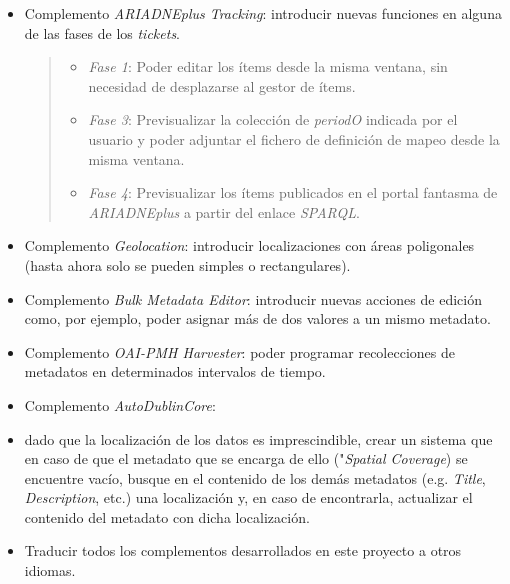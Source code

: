 \begin{itemize}
\item
  Complemento \emph{ARIADNEplus Tracking}: introducir nuevas funciones
  en alguna de las fases de los \emph{tickets}.

  \begin{quote}
  \begin{itemize}
  \tightlist
  \item
    \emph{Fase 1}: Poder editar los ítems desde la misma ventana, sin
    necesidad de desplazarse al gestor de ítems.
  \item
    \emph{Fase 3}: Previsualizar la colección de \emph{periodO} indicada
    por el usuario y poder adjuntar el fichero de definición de mapeo
    desde la misma ventana.
  \item
    \emph{Fase 4}: Previsualizar los ítems publicados en el portal
    fantasma de \emph{ARIADNEplus} a partir del enlace \emph{SPARQL}.
  \end{itemize}
  \end{quote}
\item
  Complemento \emph{Geolocation}: introducir localizaciones con áreas
  poligonales (hasta ahora solo se pueden simples o rectangulares).
\item
  Complemento \emph{Bulk Metadata Editor}: introducir nuevas acciones de
  edición como, por ejemplo, poder asignar más de dos valores a un mismo
  metadato.
\item
  Complemento \emph{OAI-PMH Harvester}: poder programar recolecciones de
  metadatos en determinados intervalos de tiempo.
\item
  Complemento \emph{AutoDublinCore}: \item
  dado que la localización de los datos es imprescindible, crear un
  sistema que en caso de que el metadato que se encarga de ello
  ("\emph{Spatial Coverage}) se encuentre vacío, busque en el contenido
  de los demás metadatos (e.g. \emph{Title}, \emph{Description}, etc.)
  una localización y, en caso de encontrarla, actualizar el contenido
  del metadato con dicha localización.
\item 
  Traducir todos los complementos desarrollados en este proyecto a otros idiomas.
\end{itemize}
